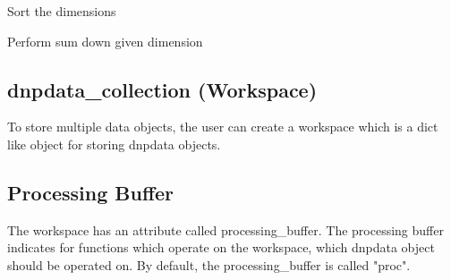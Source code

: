 \documentclass[letterpaper,10pt,english]{sphinxmanual}
\begin{document}
\begin{fulllineitems}
\begin{fulllineitems}
\label{\detokenize{dnpData:dnpLab.dnpdata.sort_dims}}
Sort the dimensions

\end{fulllineitems}


\begin{fulllineitems}
\label{\detokenize{dnpData:dnpLab.dnpdata.sum}}
Perform sum down given dimension

\end{fulllineitems}


\end{fulllineitems}



\subsection{dnpdata\_collection (Workspace)}
\label{\detokenize{dnpData:dnpdata-collection-workspace}}
To store multiple data objects, the user can create a workspace which is a dict like object for storing dnpdata objects.

\begin{sphinxVerbatim}[commandchars=\\\{\}]
   

  
\PYG{p}{[}\PYG{p}{]}  
\end{sphinxVerbatim}


\subsection{Processing Buffer}
\label{\detokenize{dnpData:processing-buffer}}
The workspace has an attribute called processing\_buffer. The processing buffer indicates for functions which operate on the workspace, which dnpdata object should be operated on. By default, the processing\_buffer is called "proc".

\begin{sphinxVerbatim}[commandchars=\\\{\}]
  
\end{sphinxVerbatim}
\end{document}
